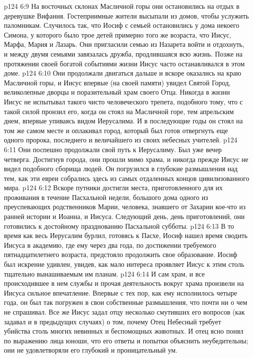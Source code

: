 \vs p124 6:9 На восточных склонах Масличной горы они остановились на отдых в деревушке Вифания. Гостеприимные жители высыпали из домов, чтобы услужить паломникам. Случилось так, что Иосиф с семьей остановились у дома некоего Симона, у которого было трое детей примерно того же возраста, что Иисус, Марфа, Мария и Лазарь. Они пригласили семью из Назарета войти и отдохнуть, и между двумя семьями завязалась дружба, продлившаяся всю жизнь. Позже на протяжении своей богатой событиями жизни Иисус часто останавливался в этом доме.
\vs p124 6:10 Они продолжали двигаться дальше и вскоре оказались на краю Масличной горы, и Иисус впервые (на своей памяти) увидел Святой Город, великолепные дворцы и поразительный храм своего Отца. Никогда в жизни Иисус не испытывал такого чисто человеческого трепета, подобного тому, что с такой силой пронзил его, когда он стоял на Масличной горе, тем апрельским днем, впервые упиваясь видом Иерусалима. И в последующие годы он стоял на том же самом месте и оплакивал город, который был готов отвергнуть еще одного пророка, последнего и величайшего из своих небесных учителей.
\vs p124 6:11 Они поспешно продолжали свой путь к Иерусалиму. Был уже вечер четверга. Достигнув города, они прошли мимо храма, и никогда прежде Иисус не видел подобного сборища людей. Он погрузился в глубокие размышления над тем, как эти евреи собрались здесь из самых отдаленных концов цивилизованного мира.
\vs p124 6:12 Вскоре путники достигли места, приготовленного для их проживания в течение Пасхальной недели, большого дома одного из преуспевающих родственников Марии, человека, знавшего от Захарии кое\hyp{}что из ранней истории и Иоанна, и Иисуса. Следующий день, день приготовлений, они готовились к достойному празднованию Пасхальной субботы.
\vs p124 6:13 В то время как весь Иерусалим бурлил, готовясь к Пасхе, Иосиф нашел время сводить Иисуса в академию, где ему через два года, по достижении требуемого пятнадцатилетнего возраста, предстояло продолжить свое образование. Иосиф был искренне удивлен, увидев, как мало интереса проявляет Иисус к этим столь тщательно вынашиваемым им планам.
\vs p124 6:14 И сам храм, и все происходившее в нем службы и прочая деятельность вокруг храма произвели на Иисуса сильное впечатление. Впервые с тех пор, как ему исполнилось четыре года, он был так погружен в свои собственные размышления, что почти ни о чем не спрашивал. Все же Иисус задал отцу несколько смутивших его вопросов (как задавал и в предыдущих случаях) о том, почему Отец Небесный требует убийства столь многих невинных и беспомощных животных. И отец ясно понял по выражению лица юноши, что его ответы и попытки объяснить неубедительны; они не удовлетворяли его глубокий и проницательный ум.
